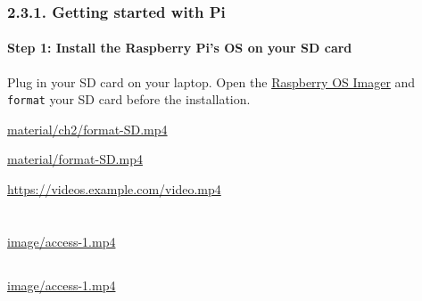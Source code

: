 \documentclass[
  letterpaper,
  DIV=11,
  numbers=noendperiod]{scrreprt}
\begin{document}

\hypertarget{getting-started-with-pi}{%
\section*{2.3.1. Getting started with
Pi}\label{getting-started-with-pi}}


\hypertarget{step-1-install-the-raspberry-pis-os-on-your-sd-card}{%
\subsection*{Step 1: Install the Raspberry Pi's OS on your SD
card}\label{step-1-install-the-raspberry-pis-os-on-your-sd-card}}

Plug in your SD card on your laptop. Open the
\href{https://www.raspberrypi.com/software/}{Raspberry OS Imager} and
\texttt{format} your SD card before the installation.

\url{material/ch2/format-SD.mp4}

\url{material/format-SD.mp4}

\url{https://videos.example.com/video.mp4}

\part{}

\hypertarget{section-2}{%
\chapter{}\label{section-2}}

\part{}

\hypertarget{section-4}{%
\chapter{}\label{section-4}}

\part{}

\hypertarget{section-6}{%
\chapter{}\label{section-6}}

\part{}

\url{image/access-1.mp4}

\hypertarget{section-8}{%
\chapter{}\label{section-8}}

\url{image/access-1.mp4}
\end{document}
